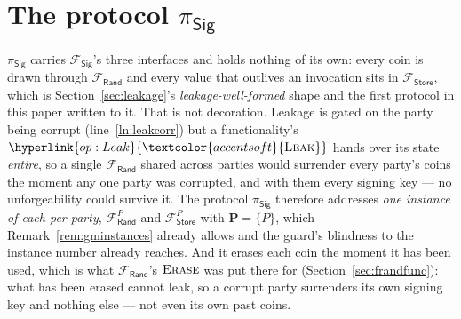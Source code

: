 \documentclass[10pt,oneside,openany]{book}
\newcommand{\Ps}{\mathbf{P}}
\newcommand{\op}[1]{\textnormal{\textsc{#1}}}
\newcommand{\opl}[1]{\hyperlink{op:#1}{\textcolor{accentsoft}{\op{#1}}}}
\newcommand{\Frand}{\mathcal{F}_{\mathsf{Rand}}}
\newcommand{\Fstore}{\mathcal{F}_{\mathsf{Store}}}
\newcommand{\Fsig}{\mathcal{F}_{\mathsf{Sig}}}
\newcommand{\psig}{\pi_{\mathsf{Sig}}}
\theoremstyle{accentdef}
\theoremstyle{accentplain}
\begin{document}
\section{The protocol \texorpdfstring{$\psig$}{π\_Sig}}\label{sec:psig}

$\psig$ carries $\Fsig$'s three interfaces and holds nothing of its own: every coin is drawn
through $\Frand$ and every value that outlives an invocation sits in $\Fstore$, which is
Section~\ref{sec:leakage}'s \emph{leakage-well-formed} shape and the first protocol in this paper
written to it. That is not decoration. Leakage is gated on the party being corrupt
(line~\ref{ln:leakcorr}) but a functionality's $\opl{Leak}$ hands over its state \emph{entire}, so
a single $\Frand$ shared across parties would surrender every party's coins the moment any one
party was corrupted, and with them every signing key --- no unforgeability could survive it.
The protocol $\psig$ therefore addresses \emph{one instance of each per party}, $\Frand^{P}$ and $\Fstore^{P}$
with $\Ps = \{P\}$, which Remark~\ref{rem:gminstances} already allows and the guard's blindness to
the instance number already reaches. And it erases each coin the moment it has been used, which is
what $\Frand$'s $\op{Erase}$ was put there for (Section~\ref{sec:frandfunc}): what has been
erased cannot leak, so a corrupt party surrenders its own signing key and nothing else --- not
even its own past coins.
\end{document}
